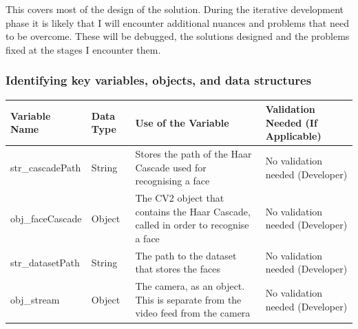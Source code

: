 \documentclass[9pt]{article}
\begin{document}
This covers most of the design of the solution. During the iterative development phase it is likely that I will encounter additional nuances and problems that need to be overcome. These will be debugged, the solutions designed and the problems fixed at the stages I encounter them.
		
\newpage
\subsubsection{Identifying key variables, objects, and data structures}

\begin{table}[H]
	\centering
	\begin{tabularx}{\textwidth}{llXX}
		\textbf{Variable Name} & \textbf{Data Type} & \textbf{Use of the Variable}                                                                                                                      & \textbf{Validation Needed (If Applicable)}                                                                                              \\ \midrule
		str\_cascadePath       & String             & Stores the path of the Haar Cascade used for recognising a face                                                                                   & No validation needed (Developer)                                                                                                        \\
		obj\_faceCascade       & Object             & The CV2 object that contains the Haar Cascade, called in order to recognise a face                                                                & No validation needed (Developer)                                                                                                        \\
		str\_datasetPath       & String             & The path to the dataset that stores the faces                                                                                                     & No validation needed (Developer)                                                                                                        \\
		obj\_stream            & Object             & The camera, as an object. This is separate from the video feed from the camera                                                                    & No validation needed (Developer)                                                                                                        \\

\end{tabularx}
\end{table}
\end{document}
